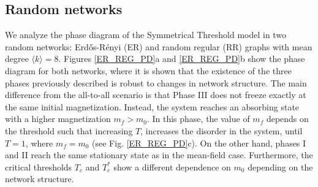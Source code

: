 	\subsection{Random networks}
	
	We analyze the phase diagram of the Symmetrical Threshold model in two random networks: Erd\H{o}s-Rényi (ER) \cite{erdos1960evolution} and random regular (RR) \cite{wormald1999models} graphs with mean degree $\langle k \rangle = 8$. Figures \ref{ER_REG_PD}a and \ref{ER_REG_PD}b show the phase diagram for both networks, where it is shown that the existence of the three phases previously described is robust to changes in network structure. The main difference from the all-to-all scenario is that Phase III does not freeze exactly at the same initial magnetization. Instead, the system reaches an absorbing state with a higher magnetization $m_f > m_0$. In this phase, the value of $m_f$ depends on the threshold such that increasing $T$, increases the disorder in the system, until $T = 1$, where $m_f = m_0$ (see Fig. \ref{ER_REG_PD}c). On the other hand, phases I and II reach the same stationary state as in the mean-field case. Furthermore, the critical thresholds $T_{c}$ and $T_{c}^{*}$ show a different dependence on $m_0$ depending on the network structure.
	
